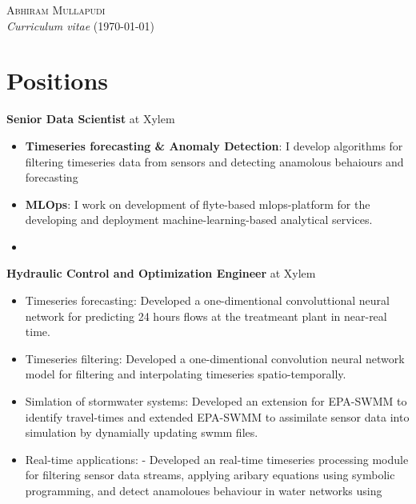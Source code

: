 \documentclass[a4paper,11pt]{article}
\newcommand{\years}[1]{%
  {\reversemarginpar\strut\marginnote{{\small#1}}}%
}
\begin{document}
{\huge \textsc{Abhiram Mullapudi}}\\
{\small \textit{Curriculum vitae} (\today)}\\


{\scriptsize
\faEnvelope{}
\faHome{}
\faGithub{}
\faLeanpub{}}


\section*{Positions}

\years{2023--}
\textbf{Senior Data Scientist} at Xylem
\begin{itemize}
	\item \textbf{Timeseries forecasting \& Anomaly Detection}: I develop algorithms for filtering timeseries data from sensors and detecting anamolous behaiours and forecasting 
	\item \textbf{MLOps}: I work on development of flyte-based mlops-platform for the developing and deployment machine-learning-based analytical services.
\item \end{itemize}

\years{2020--2023}
\textbf{Hydraulic Control and Optimization Engineer} at Xylem
\begin{itemize}
\item Timeseries forecasting: Developed a one-dimentional convoluttional neural network for predicting 24 hours flows at the treatmeant plant in near-real time. 
\item Timeseries filtering: Developed a one-dimentional convolution neural network model for filtering and interpolating timeseries spatio-temporally.
\item Simlation of stormwater systems: Developed an extension for EPA-SWMM to identify travel-times and extended EPA-SWMM to assimilate sensor data into simulation by dynamially updating swmm files.
\item Real-time applications:
- Developed an real-time timeseries processing module for filtering sensor data streams, applying aribary equations using symbolic programming, and  detect anamoloues behaviour in water networks using 
\end{itemize}
\end{document}
